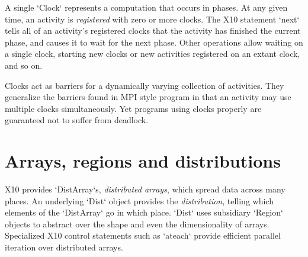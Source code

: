 A single \xcd`Clock` represents a computation that occurs in phases.
At any given time, an activity is {\em registered} with zero or more clocks.
The X10 statement \xcd`next` tells all of an activity's registered clocks that
the activity has finished the current phase, and causes it to wait for the
next phase.  Other operations allow waiting on a single clock, starting
new clocks or new activities registered on an extant clock, and so on. 


Clocks act as {barriers} for a dynamically varying collection of activities.
They generalize the barriers found in MPI style program in that an activity
may use multiple clocks simultaneously. Yet programs using clocks properly are
guaranteed not to suffer from deadlock.


\section{Arrays, regions and distributions}

X10 provides \xcd`DistArray`s, {\em distributed arrays}, which spread data
across many places. An underlying \xcd`Dist` object provides the {\em
distribution}, telling which elements of the \xcd`DistArray` go in which
place. \xcd`Dist` uses subsidiary \xcd`Region` objects to abstract over the
shape and even the dimensionality of arrays.
Specialized X10 control statements such as \xcd`ateach` provide efficient
parallel iteration over distributed arrays.


